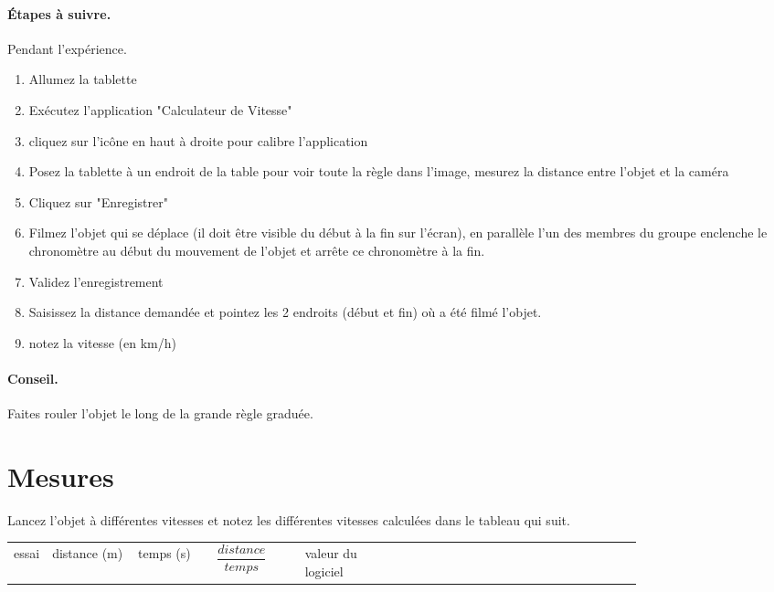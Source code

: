 \documentclass[12pt,a4paper,notitlepage]{article}
\begin{document}
\paragraph{Étapes à suivre.} Pendant l'expérience.
\begin{enumerate}
	\item Allumez la tablette
	\item Exécutez l'application "Calculateur de Vitesse"
	\item cliquez sur l'icône en haut à droite pour calibre l'application
	\item Posez la tablette à un endroit de la table pour voir toute la règle dans l'image, mesurez la distance entre l'objet et la caméra
	\item Cliquez sur "Enregistrer"
	\item Filmez l'objet qui se déplace (il doit être visible du début à la fin sur l'écran), en parallèle l'un des membres du groupe enclenche le chronomètre au début du mouvement de l'objet et arrête ce chronomètre à la fin.
	\item Validez l'enregistrement
	\item Saisissez la distance demandée et pointez les 2 endroits (début et fin) où a été filmé l'objet.
	\item notez la vitesse (en km/h)
\end{enumerate}
\paragraph{Conseil.} Faites rouler l'objet le long de la grande règle graduée.

\section{Mesures}
Lancez l'objet à différentes vitesses et notez les différentes vitesses calculées dans le tableau qui suit.
\begin{table}
	\centering
	\renewcommand*{\arraystretch}{1.25}
	\begin{tabular}{| l | m{0.20\linewidth} | m{0.20\linewidth} | m{0.20\linewidth} | m{0.20\linewidth} |}
		\hline
		essai & distance (m) & temps (s) & $\dfrac{distance}{temps}$ & valeur du logiciel \cr
		 &  &  &  &  \cr
		 &  &  &  &  \cr
		 &  &  &  &  \cr
		 &  &  &  &  \cr
		 &  &  &  &  \cr
		\hline
	\end{tabular}
\end{table}
\end{document}
